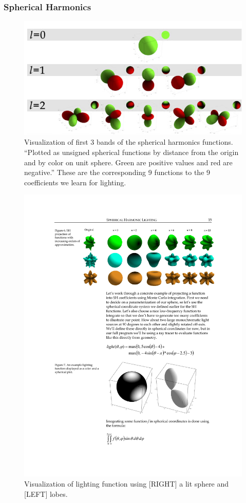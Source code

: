 \documentclass[10pt,twocolumn,letterpaper]{article}
\begin{document}
\subsubsection{Spherical Harmonics}
\begin{figure}[h!]
\centering
\includegraphics[width=1.0\columnwidth]{./assets/SHBands.png}
\caption{Visualization of first 3 bands of the spherical harmonics functions. ``Plotted as unsigned spherical functions by distance from the origin and by color on unit sphere. Green are positive values and red are negative.'' \cite{G03}  These are the corresponding 9 functions to the 9 coefficients we learn for lighting.}
\label{fig:SHBands01}
\end{figure}
\begin{figure}[h!]
\centering
\includegraphics[width=0.8\columnwidth]{./assets/SHOneBandNoCaption.pdf}
\caption{Visualization of lighting function using [RIGHT] a lit sphere  and [LEFT] lobes. \cite{G03}}
\label{fig:SHBands02}
\end{figure}
\end{document}
